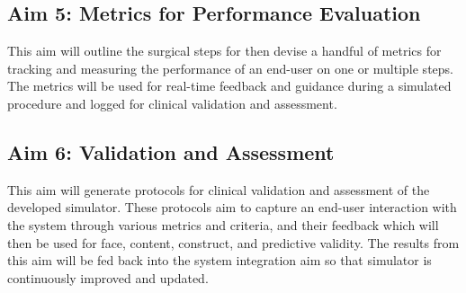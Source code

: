 \subsection{Aim 5: Metrics for Performance Evaluation}

This aim will outline the surgical steps for   then devise a handful of metrics for tracking and measuring the performance of an end-user on one or multiple steps. The metrics will be used for real-time feedback and guidance during a simulated procedure and logged for clinical validation and assessment.

\subsection{Aim 6: Validation and Assessment}

This aim will generate protocols for clinical validation and assessment of the developed simulator. These protocols aim to capture an end-user interaction with the system through various metrics and criteria, and their feedback which will then be used for face, content, construct, and predictive validity. The results from this aim will be fed back into the system integration aim so that simulator is continuously improved and updated.

